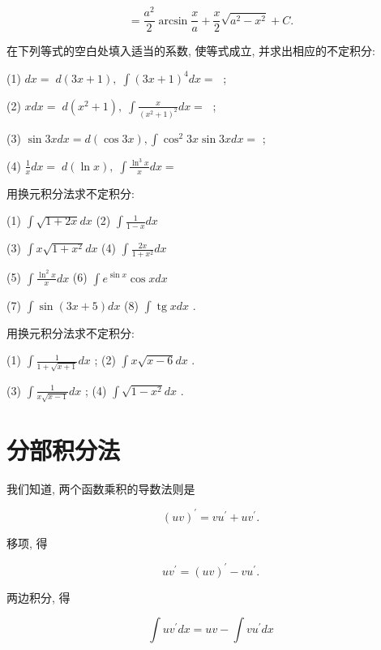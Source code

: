 \documentclass[lang=cn,newtx,10pt,scheme=chinese]{elegantbook}
\begin{document}
\[
= \frac{{a}^{2}}{2}\arcsin \frac{x}{a} + \frac{x}{2}\sqrt{{a}^{2} - {x}^{2}} + C.
\]

\begin{problemset}[练习]

\item 在下列等式的空白处填入适当的系数, 使等式成立, 并求出相应的不定积分:

(1) \({dx} = \;d\left( {{3x} + 1}\right) ,\;\int {\left( 3x + 1\right) }^{4}{dx} = \;\) ;

(2) \({xdx} = \;d\left( {{x}^{2} + 1}\right) ,\;\int \frac{x}{{\left( {x}^{2} + 1\right) }^{2}}{dx} = \;\) ;

(3) \(\sin {3xdx} = d\left( {\cos {3x}}\right) ,\int {\cos }^{2}{3x}\sin {3xdx} =\) ;

(4) \(\frac{1}{x}{dx} = \;d\left( {\ln x}\right) ,\;\int \frac{{\ln }^{3}x}{x}{dx} =\)

\item 用换元积分法求不定积分:

(1) \(\int \sqrt{1 + {2x}}{dx}\) (2) \(\int \frac{1}{1 - x}{dx}\)

(3) \(\int x\sqrt{1 + {x}^{2}}{dx}\) (4) \(\int \frac{2x}{1 + {x}^{2}}{dx}\)

(5) \(\int \frac{{\ln }^{2}x}{x}{dx}\) (6) \(\int {e}^{\sin x}\cos {xdx}\)

(7) \(\int \sin \left( {{3x} + 5}\right) {dx}\) (8) \(\int \operatorname{tg}{xdx}\) .

\item 用换元积分法求不定积分:

(1) \(\int \frac{1}{1 + \sqrt{x + 1}}{dx}\) ; (2) \(\int x\sqrt{x - 6}{dx}\) .

(3) \(\int \frac{1}{x\sqrt{x - 1}}{dx}\) ; (4) \(\int \sqrt{1 - {x}^{2}}{dx}\) .

\end{problemset}

\section{分部积分法}

我们知道, 两个函数乘积的导数法则是

\[
{\left( uv\right) }^{\prime } = v{u}^{\prime } + u{v}^{\prime }.
\]

移项, 得

\[
u{v}^{\prime } = {\left( uv\right) }^{\prime } - v{u}^{\prime }.
\]

两边积分, 得

\[
\int u{v}^{\prime }{dx} = {uv} - \int v{u}^{\prime }{dx}
\]
\end{document}
